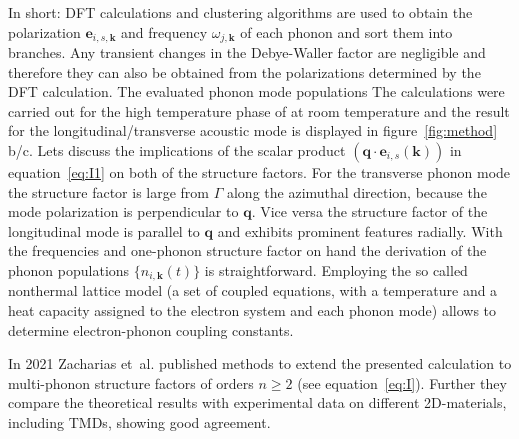 In short: \Ac{DFT} calculations and clustering algorithms are used to obtain the polarization $\mathbf{e}_{i,s,\mathbf{k}}$ and frequency $\omega_{j,\mathbf{k}}$ of each phonon and sort them into branches.
Any transient changes in the Debye-Waller factor are negligible and therefore they can also be obtained from the polarizations determined by the \ac{DFT} calculation.
The evaluated phonon mode populations 
The calculations were carried out for the high temperature phase of \ts at room temperature and the result for the longitudinal/transverse acoustic mode is displayed in figure~\ref{fig:method}\,b/c.
Lets discuss the implications of the scalar product $\left( \mathbf{q}\cdot\mathbf{e}_{i, s}(\mathbf{k}) \right)$ in equation~\ref{eq:I1} on both of the structure factors.
For the transverse phonon mode the structure factor is large from $\Gamma$ along the azimuthal direction, because the mode polarization is perpendicular to $\mathbf{q}$.
Vice versa the structure factor of the longitudinal mode is parallel to $\mathbf{q}$ and exhibits prominent features radially.
With the frequencies and one-phonon structure factor on hand the derivation of the phonon populations $\{n_{i,\mathbf{k}}(t)\}$ is straightforward.
Employing the so called nonthermal lattice model\cite{waldecker2016} (a set of coupled equations, with a temperature and a heat capacity assigned to the electron system and each phonon mode) allows to determine electron-phonon coupling constants.

In 2021 Zacharias et~al. published methods to extend the presented calculation to multi-phonon structure factors of orders $n\geq 2$ (see equation~\ref{eq:I}).
Further they compare the theoretical results with experimental data on different 2D-materials, including \acp{TMD}, showing good agreement\cite{zacharias2021a,zacharias2021b}.


